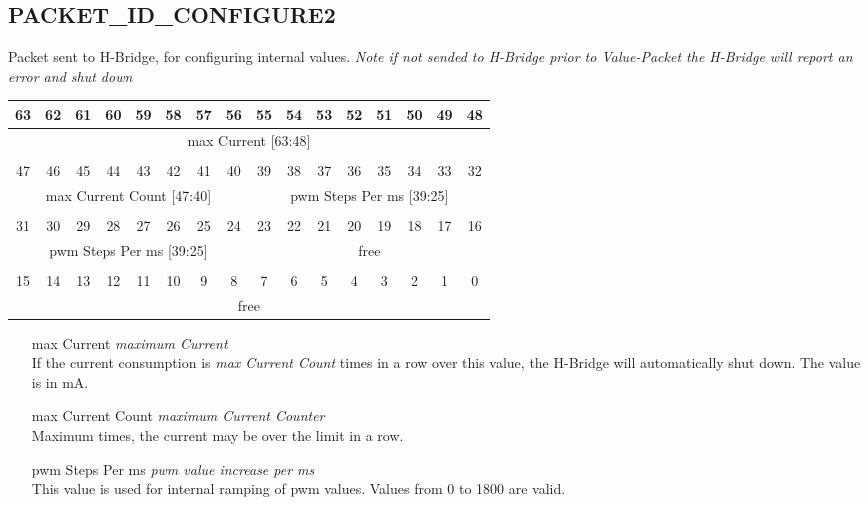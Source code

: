 \documentclass{article}
\begin{document}
\subsection{PACKET\_ID\_CONFIGURE2}
Packet sent to H-Bridge, for configuring internal values.
{\em Note if not sended to H-Bridge prior to Value-Packet the H-Bridge
  will report an error and shut down}\\
\begin{tabular} { c c c c c c c c c c c c c c c c}
  63&62&61&60&59&58&57&56&55&54&53&52&51&50&49&48\\
  \hline
  \multicolumn{16}{|c|}{max Current [63:48]} \\
  \hline
  \multicolumn{16}{c}{} \\
  47&46&45&44&43&42&41&40&39&38&37&36&35&34&33&32\\
  \hline
  \multicolumn{8}{|c|}{max Current Count [47:40]} &
  \multicolumn{8}{|c|}{pwm Steps Per ms [39:25]} \\ 
  \hline
  \multicolumn{16}{c}{} \\
  31&30&29&28&27&26&25&24&23&22&21&20&19&18&17&16\\
  \hline
  \multicolumn{8}{|c|}{pwm Steps Per ms [39:25]} & 
  \multicolumn{8}{|c|}{free} \\
  \hline
  \multicolumn{16}{c}{} \\
  15&14&13&12&11&10&9&8&7&6&5&4&3&2&1&0\\
  \hline
  \multicolumn{16}{|c|}{free} \\
  \hline
\end{tabular}
\begin{itemize}
  \item[max Current] {\it maximum Current} \\
    If the current consumption is {\em max Current Count} times
    in a row over this value, the H-Bridge will automatically 
    shut down. The value is in mA.
    
  \item[max Current Count] {\it maximum Current Counter} \\
    Maximum times, the current may be over the limit in a row.
    
  \item[pwm Steps Per ms] {\it pwm value increase per ms} \\
    This value is used for internal ramping of pwm values. 
    Values from 0 to 1800 are valid.


\end{itemize}
\end{document}
